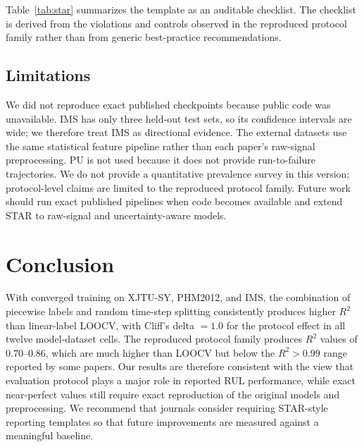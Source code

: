 \documentclass[5p,twocolumn]{elsarticle}
\begin{document}
Table~\ref{tab:star} summarizes the template as an auditable checklist. The checklist is derived from the violations and controls observed in the reproduced protocol family rather than from generic best-practice recommendations.

\begin{table}[t]
\centering
\caption{STAR evaluation template used as an auditable reporting checklist.}
\label{tab:star}
\small
{}
\end{table}

\subsection{Limitations}
We did not reproduce exact published checkpoints because public code was unavailable. IMS has only three held-out test sets, so its confidence intervals are wide; we therefore treat IMS as directional evidence. The external datasets use the same statistical feature pipeline rather than each paper's raw-signal preprocessing. PU is not used because it does not provide run-to-failure trajectories. We do not provide a quantitative prevalence survey in this version; protocol-level claims are limited to the reproduced protocol family. Future work should run exact published pipelines when code becomes available and extend STAR to raw-signal and uncertainty-aware models.

\section{Conclusion}
With converged training on XJTU-SY, PHM2012, and IMS, the combination of piecewise labels and random time-step splitting consistently produces higher $R^2$ than linear-label LOOCV, with Cliff's delta $=1.0$ for the protocol effect in all twelve model-dataset cells. The reproduced protocol family produces $R^2$ values of $0.70$--$0.86$, which are much higher than LOOCV but below the $R^2>0.99$ range reported by some papers. Our results are therefore consistent with the view that evaluation protocol plays a major role in reported RUL performance, while exact near-perfect values still require exact reproduction of the original models and preprocessing. We recommend that journals consider requiring STAR-style reporting templates so that future improvements are measured against a meaningful baseline.
\end{document}
